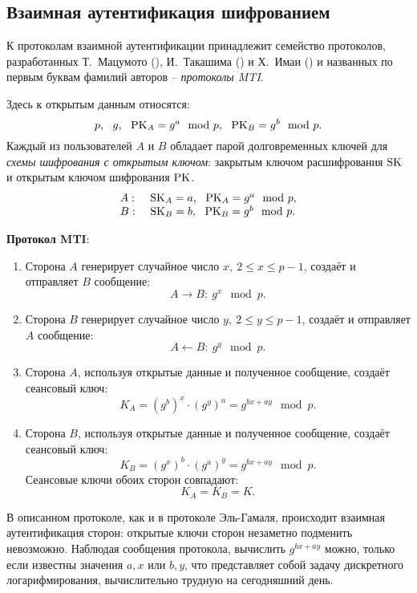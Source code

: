 \subsection{Взаимная аутентификация шифрованием}

К протоколам взаимной аутентификации принадлежит семейство протоколов, разработанных Т.~Мацумото (), И.~Такашима () и Х.~Имаи () и названных по первым буквам фамилий авторов -- \emph{протоколы MTI}.

Здесь к открытым данным относятся:
    \[ p, ~~ g, ~~ \textrm{PK}_A = g^a \mod p, ~~ \textrm{PK}_B = g^b \mod p. \]
Каждый из пользователей $A$ и $B$ обладает парой долговременных ключей для \emph{схемы шифрования с открытым ключом}: закрытым ключом расшифрования $\textrm{SK}$ и открытым ключом шифрования $\textrm{PK}$.
\[ \begin{array}{ll}
    A: & ~ \textrm{SK}_A = a, ~~ \textrm{PK}_A = g^a \mod p, \\
    B: & ~ \textrm{SK}_B = b, ~~ \textrm{PK}_B = g^b \mod p. \\
\end{array} \]

\textbf{Протокол MTI}:
\begin{enumerate}
    \item Сторона $A$ генерирует случайное число $x, ~ 2\leq x\leq p-1$, создаёт и отправляет $B$ сообщение:
        \[ A \rightarrow B: ~ g^x \mod p. \]
    \item Сторона $B$ генерирует случайное число $y, ~ 2\leq y\leq p-1$, создаёт и отправляет $A$ сообщение:
        \[ A \leftarrow B: ~ g^y \mod p. \]
    \item Сторона $A$, используя открытые данные и полученное сообщение, создаёт сеансовый ключ:
        \[ K_A = (g^b)^x \cdot (g^y)^a = g^{bx+ay} \mod p. \]
    \item Сторона $B$, используя открытые данные и полученное сообщение, создаёт сеансовый ключ:
        \[ K_B = (g^x)^b \cdot (g^a)^y = g^{bx+ay} \mod p. \]
        Сеансовые ключи обоих сторон совпадают:
        \[ K_{A} =K_{B} = K. \]
\end{enumerate}

В описанном протоколе, как и в протоколе Эль-Гамаля, происходит взаимная аутентификация сторон: открытые ключи сторон незаметно подменить невозможно. Наблюдая сообщения протокола, вычислить $g^{bx+ay}$ можно, только если известны значения $a,x$ или $b,y$, что представляет собой задачу дискретного логарифмирования, вычислительно трудную на сегодняшний день.
